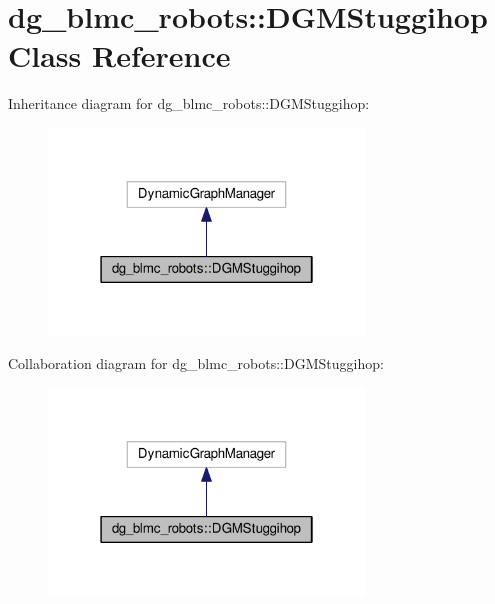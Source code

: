 \hypertarget{classdg__blmc__robots_1_1DGMStuggihop}{}\section{dg\+\_\+blmc\+\_\+robots\+:\+:D\+G\+M\+Stuggihop Class Reference}
\label{classdg__blmc__robots_1_1DGMStuggihop}


Inheritance diagram for dg\+\_\+blmc\+\_\+robots\+:\+:D\+G\+M\+Stuggihop\+:
\nopagebreak
\begin{figure}[H]
\begin{center}
\leavevmode
\includegraphics[width=238pt]{classdg__blmc__robots_1_1DGMStuggihop__inherit__graph}
\end{center}
\end{figure}


Collaboration diagram for dg\+\_\+blmc\+\_\+robots\+:\+:D\+G\+M\+Stuggihop\+:
\nopagebreak
\begin{figure}[H]
\begin{center}
\leavevmode
\includegraphics[width=238pt]{classdg__blmc__robots_1_1DGMStuggihop__coll__graph}
\end{center}
\end{figure}
